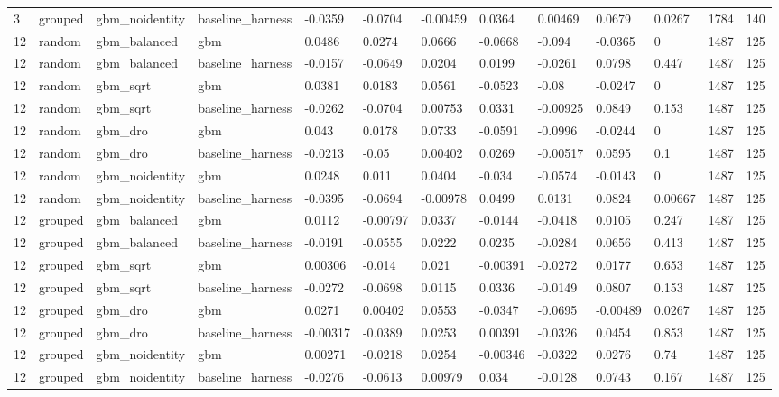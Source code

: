 \begin{tabular}{lllllllllllll}
3 & grouped & gbm\_noidentity & baseline\_harness & -0.0359 & -0.0704 & -0.00459 & 0.0364 & 0.00469 & 0.0679 & 0.0267 & 1784 & 140 \\
12 & random & gbm\_balanced & gbm & 0.0486 & 0.0274 & 0.0666 & -0.0668 & -0.094 & -0.0365 & 0 & 1487 & 125 \\
12 & random & gbm\_balanced & baseline\_harness & -0.0157 & -0.0649 & 0.0204 & 0.0199 & -0.0261 & 0.0798 & 0.447 & 1487 & 125 \\
12 & random & gbm\_sqrt & gbm & 0.0381 & 0.0183 & 0.0561 & -0.0523 & -0.08 & -0.0247 & 0 & 1487 & 125 \\
12 & random & gbm\_sqrt & baseline\_harness & -0.0262 & -0.0704 & 0.00753 & 0.0331 & -0.00925 & 0.0849 & 0.153 & 1487 & 125 \\
12 & random & gbm\_dro & gbm & 0.043 & 0.0178 & 0.0733 & -0.0591 & -0.0996 & -0.0244 & 0 & 1487 & 125 \\
12 & random & gbm\_dro & baseline\_harness & -0.0213 & -0.05 & 0.00402 & 0.0269 & -0.00517 & 0.0595 & 0.1 & 1487 & 125 \\
12 & random & gbm\_noidentity & gbm & 0.0248 & 0.011 & 0.0404 & -0.034 & -0.0574 & -0.0143 & 0 & 1487 & 125 \\
12 & random & gbm\_noidentity & baseline\_harness & -0.0395 & -0.0694 & -0.00978 & 0.0499 & 0.0131 & 0.0824 & 0.00667 & 1487 & 125 \\
12 & grouped & gbm\_balanced & gbm & 0.0112 & -0.00797 & 0.0337 & -0.0144 & -0.0418 & 0.0105 & 0.247 & 1487 & 125 \\
12 & grouped & gbm\_balanced & baseline\_harness & -0.0191 & -0.0555 & 0.0222 & 0.0235 & -0.0284 & 0.0656 & 0.413 & 1487 & 125 \\
12 & grouped & gbm\_sqrt & gbm & 0.00306 & -0.014 & 0.021 & -0.00391 & -0.0272 & 0.0177 & 0.653 & 1487 & 125 \\
12 & grouped & gbm\_sqrt & baseline\_harness & -0.0272 & -0.0698 & 0.0115 & 0.0336 & -0.0149 & 0.0807 & 0.153 & 1487 & 125 \\
12 & grouped & gbm\_dro & gbm & 0.0271 & 0.00402 & 0.0553 & -0.0347 & -0.0695 & -0.00489 & 0.0267 & 1487 & 125 \\
12 & grouped & gbm\_dro & baseline\_harness & -0.00317 & -0.0389 & 0.0253 & 0.00391 & -0.0326 & 0.0454 & 0.853 & 1487 & 125 \\
12 & grouped & gbm\_noidentity & gbm & 0.00271 & -0.0218 & 0.0254 & -0.00346 & -0.0322 & 0.0276 & 0.74 & 1487 & 125 \\
12 & grouped & gbm\_noidentity & baseline\_harness & -0.0276 & -0.0613 & 0.00979 & 0.034 & -0.0128 & 0.0743 & 0.167 & 1487 & 125 \\
\bottomrule
\end{tabular}